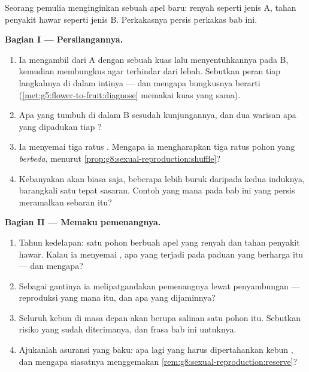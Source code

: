 \begin{problem}\label{pb:g8:sexual-reproduction:1}
Seorang pemulia menginginkan sebuah apel baru: renyah seperti jenis A,
tahan penyakit hawar seperti jenis B. Perkakasnya persis perkakas bab
ini.

\medskip\noindent\textbf{Bagian I --- Persilangannya.}
\begin{enumerate}
  \item Ia mengambil  dari  A dengan sebuah kuas
        lalu menyentuhkannya pada  B, kemudian membungkus 
        agar terhindar dari lebah. Sebutkan peran tiap langkahnya di
        dalam intinya --- dan mengapa bungkusnya berarti
        (\cref{met:g5:flower-to-fruit:diagnose} memakai kuas yang
        sama).
  \item Apa yang tumbuh di dalam  B sesudah kunjungannya, dan dua
        warisan apa yang dipadukan tiap ?
  \item Ia menyemai tiga ratus . Mengapa ia mengharapkan tiga
        ratus pohon yang \emph{berbeda}, menurut
        \cref{prop:g8:sexual-reproduction:shuffle}?
  \item Kebanyakan  akan biasa saja, beberapa lebih buruk
        daripada kedua induknya, barangkali satu tepat sasaran. Contoh
        yang mana pada bab ini yang persis meramalkan sebaran itu?
\end{enumerate}

\medskip\noindent\textbf{Bagian II --- Memaku pemenangnya.}
\begin{enumerate}[resume]
  \item Tahun kedelapan: satu pohon berbuah apel yang renyah dan tahan
        penyakit hawar. Kalau ia menyemai , apa yang terjadi
        pada paduan yang berharga itu --- dan mengapa?
  \item Sebagai gantinya ia melipatgandakan pemenangnya lewat
        penyambungan --- reproduksi yang mana itu, dan apa yang
        dijaminnya?
  \item Seluruh kebun  di masa depan akan berupa salinan satu
        pohon itu. Sebutkan risiko yang sudah diterimanya, dan frasa
        bab ini untuknya.
  \item Ajukanlah asuransi yang baku: apa lagi yang harus dipertahankan
        kebun , dan mengapa siasatnya menggemakan
        \cref{rem:g8:sexual-reproduction:reserve}?
\end{enumerate}


\end{problem}
